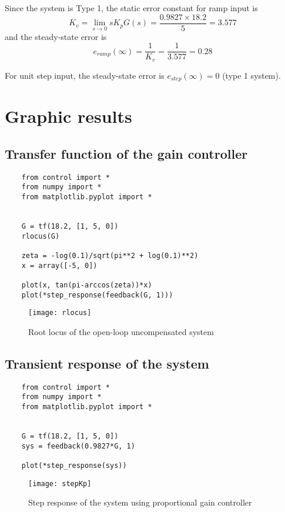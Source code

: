 Since the system is Type 1, the static error constant for ramp input is
\begin{equation}
	K_v = \lim\limits_{s\rightarrow 0} sK_pG(s) = \dfrac{0.9827\times 18.2}{5} = 3.577
\end{equation}
and the steady-state error is
\begin{equation}
	e_{ramp}(\infty) = \dfrac{1}{K_v} = \dfrac{1}{3.577} = 0.28
\end{equation}

For unit step input, the steady-state error is $ e_{step}(\infty) = 0 $ (type 1 system).

\section{Graphic results}
\subsection{Transfer function of the gain controller}
\begin{verbatim}
	from control import *
	from numpy import *
	from matplotlib.pyplot import *
	
	
	G = tf(18.2, [1, 5, 0])
	rlocus(G)
	
	zeta = -log(0.1)/sqrt(pi**2 + log(0.1)**2)
	x = array([-5, 0])
	
	plot(x, tan(pi-arccos(zeta))*x)
	plot(*step_response(feedback(G, 1)))
\end{verbatim}

\begin{figure}[ht]
	\centering
	\texttt{[image: rlocus]}
	\caption{Root locus of the open-loop uncompensated system}
	\label{f1}
\end{figure}

\subsection{Transient response of the system}
\begin{verbatim}
	from control import *
	from numpy import *
	from matplotlib.pyplot import *
	
	
	G = tf(18.2, [1, 5, 0])
	sys = feedback(0.9827*G, 1)
	
	plot(*step_response(sys))
\end{verbatim}
\begin{figure}[ht]
	\centering
	\texttt{[image: stepKp]}
	\caption{Step response of the system using proportional gain controller}
\end{figure}
